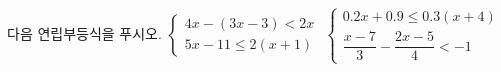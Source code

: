 다음 연립부등식을 푸시오.
 $\begin{cases} 4x-(3x-3)<2x \\ 5x-11\le 2(x+1) \end{cases}$
 $\begin{cases} 0.2x+0.9\le 0.3(x+4) \\ \dfrac{x-7}{3}-\dfrac{2x-5}{4}<-1 \end{cases}$
